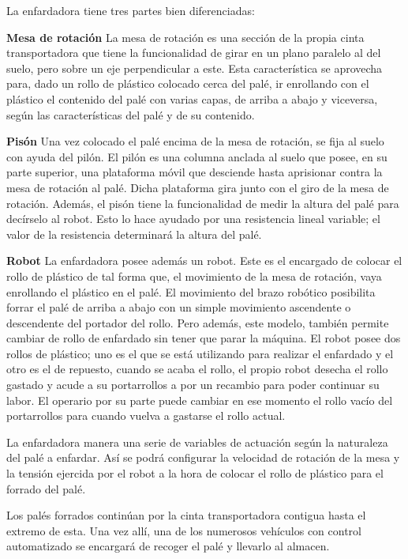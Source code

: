 \documentclass[11pt,a4paper,spanish,twoside]{report}
\begin{document}
La enfardadora tiene tres partes bien diferenciadas:
\begin{description}
\item \textbf{Mesa de rotación}
La mesa de rotación es una sección de la propia cinta transportadora que tiene 
la funcionalidad de girar en un plano paralelo al del suelo, pero sobre un eje 
perpendicular a este. Esta característica se aprovecha para, dado un rollo de 
plástico colocado cerca del palé, ir enrollando con el plástico el contenido 
del palé con varias capas, de arriba a abajo y viceversa, según las 
características del palé y de su contenido.
\item \textbf{Pisón}
Una vez colocado el palé encima de la mesa de rotación, se fija al suelo con 
ayuda del pilón. El pilón es una columna anclada al suelo que posee, en su 
parte superior, una plataforma móvil que desciende hasta aprisionar contra la
mesa de rotación al palé. Dicha plataforma gira junto con el giro de la mesa de
rotación. Además, el pisón tiene la funcionalidad de medir la altura del palé 
para decírselo al robot. Esto lo hace ayudado por una resistencia lineal
variable; el valor de la resistencia determinará la altura del palé.
\item \textbf{Robot}
La enfardadora posee además un robot. Este es el encargado de colocar el rollo 
de plástico de tal forma que, el movimiento de la mesa de rotación, vaya 
enrollando el plástico en el palé. El movimiento del brazo robótico posibilita 
forrar el palé de arriba a abajo con un simple movimiento ascendente o 
descendente del portador del rollo. Pero además, este modelo, también permite 
cambiar de rollo de enfardado sin tener que parar la máquina. El robot posee 
dos rollos de plástico; uno es el que se está utilizando para realizar el 
enfardado y el otro es el de repuesto, cuando se acaba el rollo, el propio 
robot desecha el rollo gastado y acude a su portarrollos a por un recambio para
poder continuar su labor. El operario por su parte puede cambiar en ese momento
el rollo vacío del portarrollos para cuando vuelva a gastarse el rollo actual.

La enfardadora manera una serie de variables de actuación según la naturaleza
del palé a enfardar. Así se podrá configurar la velocidad de rotación de la 
mesa y la tensión ejercida por el robot a la hora de colocar el rollo de 
plástico para el forrado del palé.

Los palés forrados continúan por la cinta transportadora contigua hasta el 
extremo de esta. Una vez allí, una de los numerosos vehículos con control 
automatizado se encargará de recoger el palé y llevarlo al almacen.


\end{description}
\end{document}
